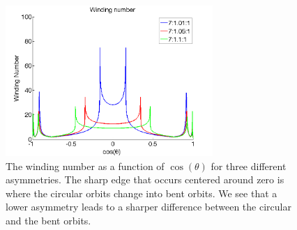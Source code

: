 \begin{figure}[H]
\begin{center}
\includegraphics[width=0.7\textwidth]{figures/theory/WindingTrend.png}
\end{center}
\caption{The winding number as a function of $\cos(\theta)$ for three different asymmetries. The sharp edge that occurs centered around zero is where the circular orbits change into bent orbits. We see that a lower asymmetry leads to a sharper difference between the circular and the bent orbits.}
\label{fig:windingdifferent}
\end{figure}

